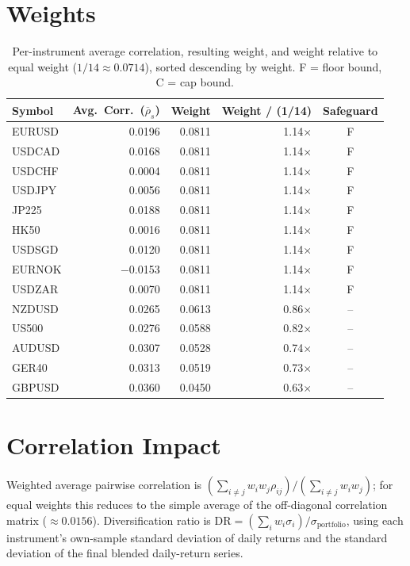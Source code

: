 \documentclass[11pt]{article}
\begin{document}
\section{Weights}

\begin{table}[h]
\centering
\caption{Per-instrument average correlation, resulting weight, and weight relative
to equal weight ($1/14 \approx 0.0714$), sorted descending by weight. F = floor
bound, C = cap bound.}
\begin{tabular}{lrrrc}
\toprule
Symbol & Avg.\ Corr.\ ($\overline{\rho}_s$) & Weight & Weight / (1/14) & Safeguard \\
\midrule
EURUSD & 0.0196 & 0.0811 & 1.14$\times$ & F \\
USDCAD & 0.0168 & 0.0811 & 1.14$\times$ & F \\
USDCHF & 0.0004 & 0.0811 & 1.14$\times$ & F \\
USDJPY & 0.0056 & 0.0811 & 1.14$\times$ & F \\
JP225  & 0.0188 & 0.0811 & 1.14$\times$ & F \\
HK50   & 0.0016 & 0.0811 & 1.14$\times$ & F \\
USDSGD & 0.0120 & 0.0811 & 1.14$\times$ & F \\
EURNOK & $-$0.0153 & 0.0811 & 1.14$\times$ & F \\
USDZAR & 0.0070 & 0.0811 & 1.14$\times$ & F \\
NZDUSD & 0.0265 & 0.0613 & 0.86$\times$ & -- \\
US500  & 0.0276 & 0.0588 & 0.82$\times$ & -- \\
AUDUSD & 0.0307 & 0.0528 & 0.74$\times$ & -- \\
GER40  & 0.0313 & 0.0519 & 0.73$\times$ & -- \\
GBPUSD & 0.0360 & 0.0450 & 0.63$\times$ & -- \\
\bottomrule
\end{tabular}
\end{table}

\section{Correlation Impact}

Weighted average pairwise correlation is
$\left(\sum_{i \neq j} w_i w_j \rho_{ij}\right) / \left(\sum_{i \neq j} w_i w_j\right)$;
for equal weights this reduces to the simple average of the off-diagonal
correlation matrix ($\approx 0.0156$). Diversification ratio is
$\mathrm{DR} = \left(\sum_i w_i \sigma_i\right) / \sigma_{\text{portfolio}}$,
using each instrument's own-sample standard deviation of daily returns and the
standard deviation of the final blended daily-return series.
\end{document}
